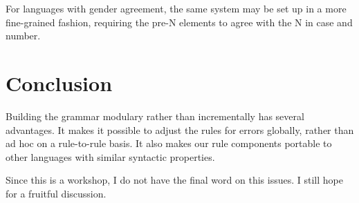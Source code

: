 \documentclass[a4paper,english]{article} %
\begin{document}
For languages with gender agreement, the same system may be set up in a more fine-grained fashion, requiring the pre-N elements to agree with the N in case and number.%

\section{Conclusion}

Building the grammar modulary rather than incrementally has several advantages. It makes it possible to adjust the rules for errors globally, rather than ad hoc on a rule-to-rule basis. It also makes our rule components portable to other languages with similar syntactic properties.%



Since this is a workshop, I do not have the final word on this issues. I still hope for a fruitful discussion.%

       

\end{document}
